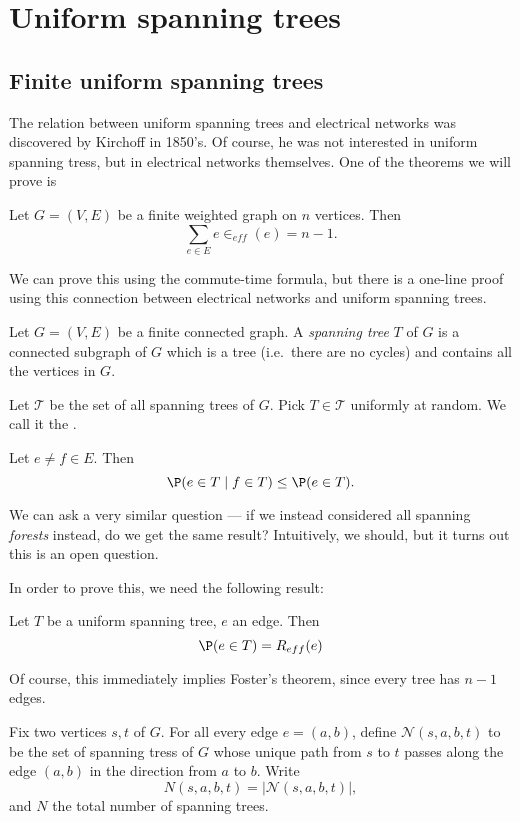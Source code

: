 \documentclass[a4paper]{article}
\begin{document}
\section{Uniform spanning trees}
\subsection{Finite uniform spanning trees}
The relation between uniform spanning trees and electrical networks was discovered by Kirchoff in 1850's. Of course, he was not interested in uniform spanning tress, but in electrical networks themselves. One of the theorems we will prove is
\begin{thm}
  Let $G = (V, E)$ be a finite weighted graph on $n$ vertices. Then
  \[
    \sum_{e \in E}e \in _{eff}(e) = n - 1.
  \]
\end{thm}
We can prove this using the commute-time formula, but there is a one-line proof using this connection between electrical networks and uniform spanning trees.
\begin{defi}
  Let $G = (V, E)$ be a finite connected graph. A \emph{spanning tree} $T$ of $G$ is a connected subgraph of $G$ which is a tree (i.e.\ there are no cycles) and contains all the vertices in $G$.
\end{defi}

Let $\mathcal{T}$ be the set of all spanning trees of $G$. Pick $T \in \mathcal{T}$ uniformly at random. We call it the .
\begin{thm}
  Let $e \not= f \in E$. Then
  \[
    \P(e \in T \mid f \in T) \leq \P(e \in T).
  \]
\end{thm}
We can ask a very similar question --- if we instead considered all spanning \emph{forests} instead, do we get the same result? Intuitively, we should, but it turns out this is an open question.

In order to prove this, we need the following result:
\begin{thm}[Kirchoff]
  Let $T$ be a uniform spanning tree, $e$ an edge. Then
  \[
    \P(e \in T) = R_{eff}(e)
  \]
\end{thm}
Of course, this immediately implies Foster's theorem, since every tree has $n - 1$ edges.

\begin{notation}
  Fix two vertices $s, t$ of $G$. For all every edge $e = (a, b)$, define $\mathcal{N}(s, a, b, t)$ to be the set of spanning tress of $G$ whose unique path from $s$ to $t$ passes along the edge $(a, b)$ in the direction from $a$ to $b$. Write
  \[
    N(s, a, b, t) = |\mathcal{N}(s, a, b, t)|,
  \]
  and $N$ the total number of spanning trees.
\end{notation}
\end{document}
